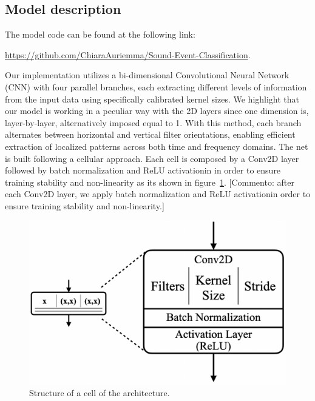 \documentclass{article}
\begin{document}
\begin{sloppy}
\subsection{Model description}
\label{sec:model_description}
The model code can be found at the following link:

\url{https://github.com/ChiaraAuriemma/Sound-Event-Classification}.


Our implementation utilizes a bi-dimensional Convolutional Neural Network (CNN)
with four parallel branches, each extracting different levels of information from the
input data using specifically calibrated kernel sizes. 
We highlight that our model is working in a peculiar way with the 2D layers since one dimension is, layer-by-layer, alternatively
imposed equal to 1. With this method, each branch alternates between horizontal and vertical filter orientations,
enabling efficient extraction of localized patterns across both time and frequency domains.
The net is built following a cellular approach. Each cell is composed by a Conv2D layer followed by batch normalization and
ReLU activationin in order to ensure training stability and non-linearity as its shown in figure~\ref{fig:simple_cell}.
[Commento: after each Conv2D layer, we apply batch normalization and ReLU activationin order to ensure training stability and non-linearity.]
\begin{figure}[ht]
  \centering
  \centerline{\includegraphics[width=\columnwidth]{simple_cell.png}}
  \caption{Structure of a cell of the architecture.}
  \label{fig:simple_cell}
\end{figure}


\end{sloppy}
\end{document}
